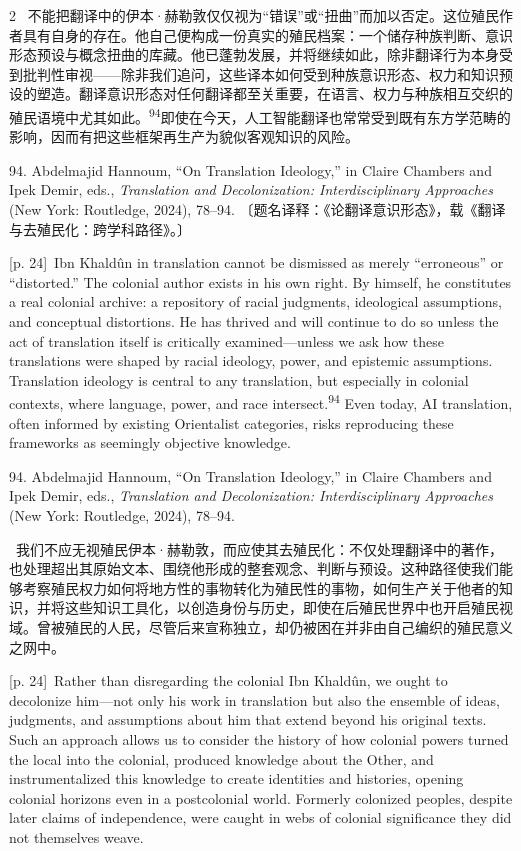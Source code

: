 \documentclass[10pt,a4paper]{article}
\begin{document}
\begin{paracol}{2}
\switchcolumn*
{\scriptsize\color{gray} [p. 24]}\ 不能把翻译中的伊本·赫勒敦仅仅视为“错误”或“扭曲”而加以否定。这位殖民作者具有自身的存在。他自己便构成一份真实的殖民档案：一个储存种族判断、意识形态预设与概念扭曲的库藏。他已蓬勃发展，并将继续如此，除非翻译行为本身受到批判性审视——除非我们追问，这些译本如何受到种族意识形态、权力和知识预设的塑造。翻译意识形态对任何翻译都至关重要，在语言、权力与种族相互交织的殖民语境中尤其如\mbox{此。\textsuperscript{94}}即使在今天，人工智能翻译也常常受到既有东方学范畴的影响，因而有把这些框架再生产为貌似客观知识的风险。\par{\small 94. Abdelmajid Hannoum, “On Translation Ideology,” in Claire Chambers and Ipek Demir, eds., \textit{Translation and Decolonization: Interdisciplinary Approaches} (New York: Routledge, 2024), 78–94. 〔题名译释：《论翻译意识形态》，载《翻译与去殖民化：跨学科路径》。〕\par}
\switchcolumn
{\scriptsize\color{gray} [p. 24]}\ Ibn Khaldûn in translation cannot be dismissed as merely “erroneous” or “distorted.” The colonial author exists in his own right. By himself, he constitutes a real colonial archive: a repository of racial judgments, ideological assumptions, and conceptual distortions. He has thrived and will continue to do so unless the act of translation itself is critically examined—unless we ask how these translations were shaped by racial ideology, power, and epistemic assumptions. Translation ideology is central to any translation, but especially in colonial contexts, where language, power, and race intersect.\nobreak\textsuperscript{94} Even today, AI translation, often informed by existing Orientalist categories, risks reproducing these frameworks as seemingly objective knowledge.\par{\small 94. Abdelmajid Hannoum, “On Translation Ideology,” in Claire Chambers and Ipek Demir, eds., \textit{Translation and Decolonization: Interdisciplinary Approaches} (New York: Routledge, 2024), 78–94.\par}
\switchcolumn*
{\scriptsize\color{gray} [p. 24]}\ 我们不应无视殖民伊本·赫勒敦，而应使其去殖民化：不仅处理翻译中的著作，也处理超出其原始文本、围绕他形成的整套观念、判断与预设。这种路径使我们能够考察殖民权力如何将地方性的事物转化为殖民性的事物，如何生产关于他者的知识，并将这些知识工具化，以创造身份与历史，即使在后殖民世界中也开启殖民视域。曾被殖民的人民，尽管后来宣称独立，却仍被困在并非由自己编织的殖民意义之网中。\par
\switchcolumn
{\scriptsize\color{gray} [p. 24]}\ Rather than disregarding the colonial Ibn Khaldûn, we ought to decolonize him—not only his work in translation but also the ensemble of ideas, judgments, and assumptions about him that extend beyond his original texts. Such an approach allows us to consider the history of how colonial powers turned the local into the colonial, produced knowledge about the Other, and instrumentalized this knowledge to create identities and histories, opening colonial horizons even in a postcolonial world. Formerly colonized peoples, despite later claims of independence, were caught in webs of colonial significance they did not themselves weave.\par

\end{paracol}
\end{document}
